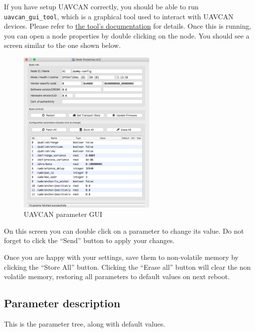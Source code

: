 If you have setup UAVCAN correctly, you should be able to run
\texttt{uavcan\_gui\_tool}, which is a graphical tool used to interact
with UAVCAN devices. Please refer to
\href{http://uavcan.org/GUI_Tool/Overview/}{the tool's documentation}
for details. Once this is running, you can open a node properties by
double clicking on the node. You should see a screen similar to the one
shown below.

\begin{figure}
\centering
\includegraphics[width=0.60000\textwidth]{figures/uavcan_gui.png}
\caption{UAVCAN parameter GUI}
\end{figure}

On this screen you can double click on a parameter to change its value.
Do not forget to click the ``Send'' button to apply your changes.

Once you are happy with your settings, save them to non-volatile memory
by clicking the ``Store All'' button. Clicking the ``Erase all'' button
will clear the non volatile memory, restoring all parameters to default
values on next reboot.

\subsection{Parameter description}\label{parameter-description}

This is the parameter tree, along with default values.

